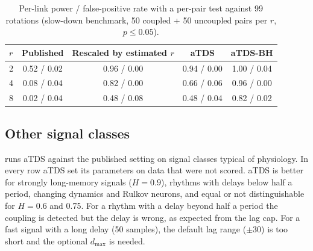 \documentclass[11pt,a4paper]{article}
\begin{document}
\begin{table}[t]
\centering
\caption{Per-link power / false-positive rate with a per-pair test against 99 rotations (slow-down benchmark, 50 coupled + 50 uncoupled pairs per $r$, $p \le 0.05$).}
\label{tab:power}
\footnotesize
\begin{tabular}{lcccc}
\toprule
$r$ & Published & Rescaled by estimated $r$ & aTDS & aTDS-BH \\
\midrule
2 & 0.52 / 0.02 & 0.96 / 0.00 & 0.94 / 0.00 & 1.00 / 0.04 \\
4 & 0.08 / 0.04 & 0.82 / 0.00 & 0.66 / 0.06 & 0.96 / 0.00 \\
8 & 0.02 / 0.04 & 0.48 / 0.08 & 0.48 / 0.04 & 0.82 / 0.02 \\
\bottomrule
\end{tabular}
\end{table}

\subsection{Other signal classes}
 runs aTDS against the published setting on signal classes typical of physiology. In every row aTDS set its parameters on data that were not scored. aTDS is better for strongly long-memory signals ($H = 0.9$), rhythms with delays below half a period, changing dynamics and Rulkov neurons, and equal or not distinguishable for $H = 0.6$ and 0.75. For a rhythm with a delay beyond half a period the coupling is detected but the delay is wrong, as expected from the lag cap. For a fast signal with a long delay (50 samples), the default lag range ($\pm30$) is too short and the optional $d_{\max}$ is needed.
\end{document}
